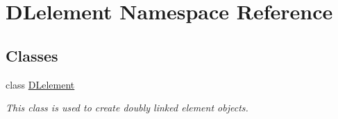 \hypertarget{namespace_d_lelement}{}\section{D\+Lelement Namespace Reference}
\label{namespace_d_lelement}
\subsection*{Classes}
\begin{DoxyCompactItemize}
\item 
class \hyperlink{class_d_lelement_1_1_d_lelement}{D\+Lelement}
\begin{DoxyCompactList}\small\item\em This class is used to create doubly linked element objects. \end{DoxyCompactList}\end{DoxyCompactItemize}
